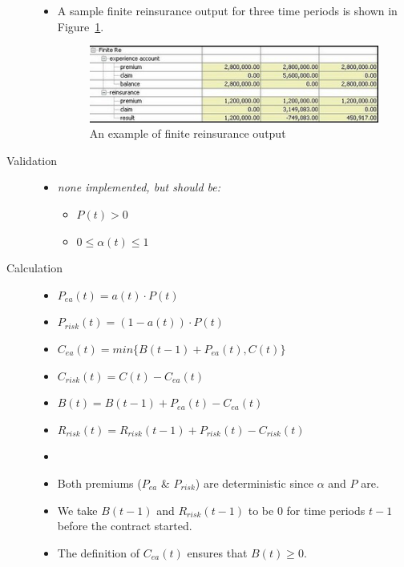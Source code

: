 \begin{description}
\begin{itemize}
			\item[] A sample finite reinsurance output for three time periods is shown in Figure~\ref{fig:FiniteReOutput}.
			\begin{figure}
				\centering
					\includegraphics{images/FiniteReOutput.png}
				\caption{An example of finite reinsurance output}
				\label{fig:FiniteReOutput}
			\end{figure}
		\end{itemize}
	\item[Validation] \hfill
		\begin{itemize}%
			\item[] \emph{none implemented, but should be:}
			\begin{itemize}%
				\item[] $P(t)>0$
				\item[] $0 \leq \alpha(t) \leq 1$
			\end{itemize}
		\end{itemize}
	\item[Calculation] \hfill
		\begin{itemize}%
			\item $P_{ea}(t) = a(t) \cdot P(t)$
			\item $P_{risk}(t) = (1 - a(t)) \cdot P(t)$
			\item $C_{ea}(t) = min\{B(t-1) + P_{ea}(t), C(t)\}$
			\item $C_{risk}(t) = C(t) - C_{ea}(t)$
			\item $B(t) = B(t-1) + P_{ea}(t) - C_{ea}(t)$
			\item $R_{risk}(t) = R_{risk}(t-1) + P_{risk}(t) - C_{risk}(t)$
			\item[] \note{}
			\item[] Both premiums ($P_{ea}$ \& $P_{risk}$) are deterministic since $\alpha$ and $P$ are.
			\item[] We take $B(t-1)$ and $R_{risk}(t-1)$ to be $0$ for time periods $t-1$ before the contract started.
			\item[] The definition of $C_{ea}(t)$ ensures that $B(t) \geq 0$.
		\end{itemize}
\end{description}




